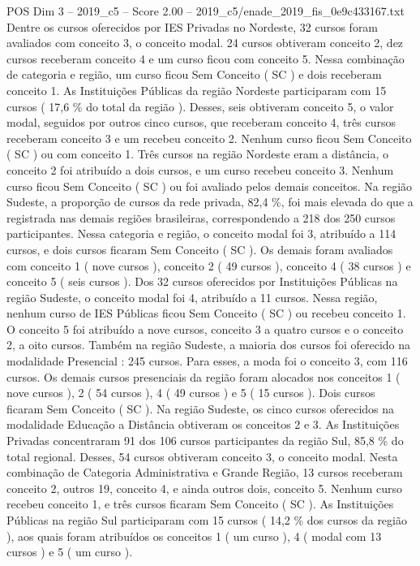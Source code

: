 \begin{textsample}{POS Dim 3 – 2019\_c5 – Score 2.00 – 2019\_c5/enade\_2019\_fis\_0e9c433167.txt}
Dentre os cursos oferecidos por IES Privadas no Nordeste, 32 cursos foram avaliados com conceito 3, o conceito modal. 24 cursos obtiveram conceito 2, dez cursos receberam conceito 4 e um curso ficou com conceito 5.
Nessa combinação de categoria e região, um curso ficou Sem Conceito ( SC ) e dois receberam conceito 1.
As Instituições Públicas da região Nordeste participaram com 15 cursos ( 17,6 \% do total da região ).
Desses, seis obtiveram conceito 5, o valor modal, seguidos por outros cinco cursos, que receberam conceito 4, três cursos receberam conceito 3 e um recebeu conceito 2.
Nenhum curso ficou Sem Conceito ( SC ) ou com conceito 1.
Três cursos na região Nordeste eram a distância, o conceito 2 foi atribuído a dois cursos, e um curso recebeu conceito 3.
Nenhum curso ficou Sem Conceito ( SC ) ou foi avaliado pelos demais conceitos.
Na região Sudeste, a proporção de cursos da rede privada, 82,4 \%, foi mais elevada do que a registrada nas demais regiões brasileiras, correspondendo a 218 dos 250 cursos participantes.
Nessa categoria e região, o conceito modal foi 3, atribuído a 114 cursos, e dois cursos ficaram Sem Conceito ( SC ).
Os demais foram avaliados com conceito 1 ( nove cursos ), conceito 2 ( 49 cursos ), conceito 4 ( 38 cursos ) e conceito 5 ( seis cursos ).
Dos 32 cursos oferecidos por Instituições Públicas na região Sudeste, o conceito modal foi 4, atribuído a 11 cursos.
Nessa região, nenhum curso de IES Públicas ficou Sem Conceito ( SC ) ou recebeu conceito 1.
O conceito 5 foi atribuído a nove cursos, conceito 3 a quatro cursos e o conceito 2, a oito cursos.
Também na região Sudeste, a maioria dos cursos foi oferecido na modalidade Presencial : 245 cursos.
Para esses, a moda foi o conceito 3, com 116 cursos.
Os demais cursos presenciais da região foram alocados nos conceitos 1 ( nove cursos ), 2 ( 54 cursos ), 4 ( 49 cursos ) e 5 ( 15 cursos ).
Dois cursos ficaram Sem Conceito ( SC ).
Na região Sudeste, os cinco cursos oferecidos na modalidade Educação a Distância obtiveram os conceitos 2 e 3.
As Instituições Privadas concentraram 91 dos 106 cursos participantes da região Sul, 85,8 \% do total regional.
Desses, 54 cursos obtiveram conceito 3, o conceito modal.
Nesta combinação de Categoria Administrativa e Grande Região, 13 cursos receberam conceito 2, outros 19, conceito 4, e ainda outros dois, conceito 5.
Nenhum curso recebeu conceito 1, e três cursos ficaram Sem Conceito ( SC ).
As Instituições Públicas na região Sul participaram com 15 cursos ( 14,2 \% dos cursos da região ), aos quais foram atribuídos os conceitos 1 ( um curso ), 4 ( modal com 13 cursos ) e 5 ( um curso ).

\end{textsample}
